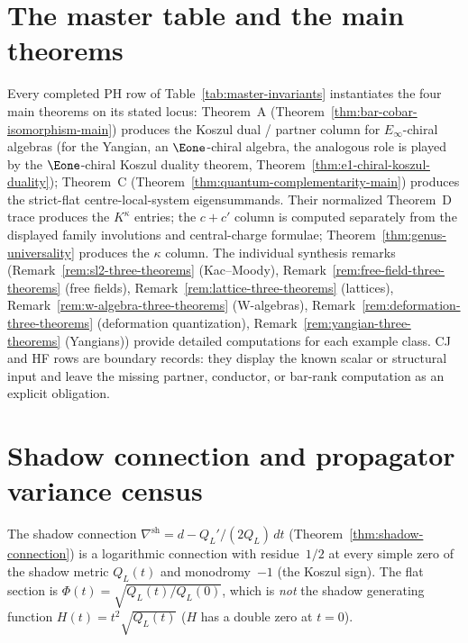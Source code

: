 \section*{The master table and the main theorems}

Every completed PH row of Table~\ref{tab:master-invariants}
instantiates the four main theorems on its stated locus:
Theorem~A (Theorem~\ref{thm:bar-cobar-isomorphism-main}) produces the
Koszul dual / partner column for $E_\infty$-chiral algebras (for the
Yangian, an $\Eone$-chiral algebra, the analogous role is played by
the $\Eone$-chiral Koszul duality theorem,
Theorem~\ref{thm:e1-chiral-koszul-duality});
Theorem~C (Theorem~\ref{thm:quantum-complementarity-main}) produces the
strict-flat centre-local-system eigensummands.  Their normalized
Theorem~D trace produces the $K^\kappa$ entries; the $c+c'$ column is
computed separately from the displayed family involutions and
central-charge formulae;
Theorem~\ref{thm:genus-universality} produces the $\kappa$ column.
The individual synthesis remarks (Remark~\ref{rem:sl2-three-theorems}
(Kac--Moody), Remark~\ref{rem:free-field-three-theorems} (free fields),
Remark~\ref{rem:lattice-three-theorems} (lattices),
Remark~\ref{rem:w-algebra-three-theorems} (W-algebras),
Remark~\ref{rem:deformation-three-theorems} (deformation quantization),
Remark~\ref{rem:yangian-three-theorems} (Yangians)) provide
detailed computations for each example class.
CJ and HF rows are boundary records: they display the known scalar or
structural input and leave the missing partner, conductor, or
bar-rank computation as an explicit obligation.


\section*{Shadow connection and propagator variance census}
\label{sec:shadow-connection-census}

The shadow connection
$\nabla^{\mathrm{sh}} = d - Q_L'/(2Q_L)\,dt$
(Theorem~\ref{thm:shadow-connection})
is a logarithmic connection with residue~$1/2$ at every
simple zero of the shadow metric $Q_L(t)$ and monodromy~$-1$
(the Koszul sign). The flat section is
$\Phi(t) = \sqrt{Q_L(t)/Q_L(0)}$, which is \emph{not}
the shadow generating function $H(t) = t^2\sqrt{Q_L(t)}$
($H$ has a double zero at $t=0$).


